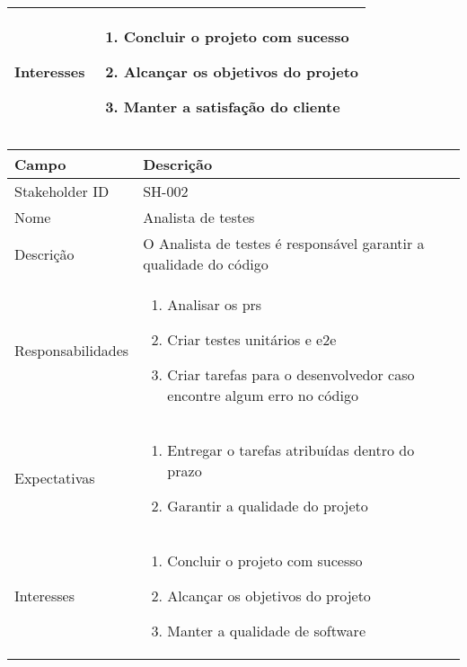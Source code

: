 \begin{tabularx}{\textwidth}{| l | X |}
    \\ \hline
    Interesses        & 
    \begin{enumerate}
        \item Concluir o projeto com sucesso
        \item Alcançar os objetivos do projeto
        \item Manter a satisfação do cliente
    \end{enumerate}

    \\ \hline    
\end{tabularx}

\vspace{1cm}

\noindent
\begin{tabularx}{\textwidth}{| l | X |}
\hline
Campo             & Descrição                                                                                                                                                                           \\ \hline
Stakeholder ID    & SH-002                                                                                                                                                                              \\ \hline
Nome              & Analista de testes                                                                                                                                                                       \\ \hline
Descrição         & O Analista de testes é responsável garantir a qualidade do código
\\ \hline
Responsabilidades & 
\begin{enumerate}
    \item Analisar os \gls{prs}
    \item Criar testes unitários e \acrshort{e2e}
    \item Criar tarefas para o desenvolvedor caso encontre algum erro no código
\end{enumerate}
\\ \hline

Expectativas      &
\begin{enumerate}
    \item Entregar o tarefas atribuídas dentro do prazo
    \item Garantir a qualidade do projeto
\end{enumerate}
\\ \hline

Interesses        &
\begin{enumerate}
    \item Concluir o projeto com sucesso
    \item Alcançar os objetivos do projeto
    \item Manter a qualidade de software
\end{enumerate}
\\ \hline

\end{tabularx}

